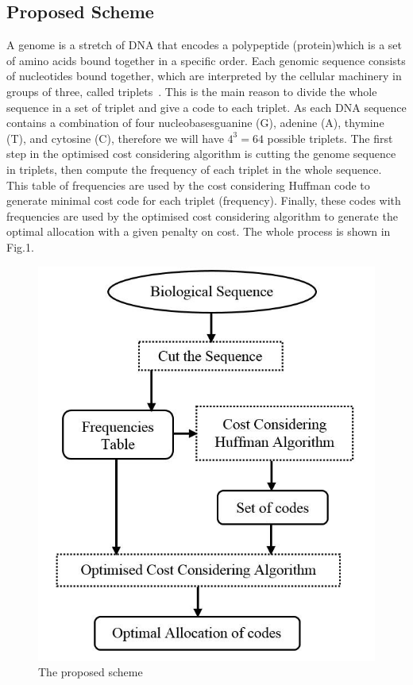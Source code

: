 \documentclass[preprint,12pt]{elsarticle}
\begin{document}
\subsection{Proposed Scheme}

A genome is a stretch of DNA that encodes  a polypeptide (protein)which is a set of amino acids bound together in a specific order. Each genomic sequence consists of nucleotides bound together, which are interpreted by the cellular machinery in groups of three, called triplets~\cite{Harvey00}. This is the main reason to divide the whole sequence in a set of triplet and give a code to each triplet. As each DNA sequence contains a combination of four nucleobases\textemdash guanine (G), adenine (A), thymine (T), and cytosine (C), therefore we will have $4^3=64$ possible triplets.  The first step in the optimised cost considering algorithm is cutting the genome sequence in triplets, then compute the frequency of each triplet in the whole sequence. This table of frequencies are used by the cost considering Huffman code to generate minimal cost code for each triplet (frequency). Finally, these codes with frequencies are used by the optimised cost considering algorithm to generate the optimal allocation with a given  penalty on cost. The whole process is shown in Fig.1.%

\begin{figure}[t]
\begin{center}
\includegraphics[scale=0.4]{Images/Drawing3_1.jpg}
\caption{The proposed scheme}
\end{center}
\label{Fig1}
\end{figure}
\end{document}
